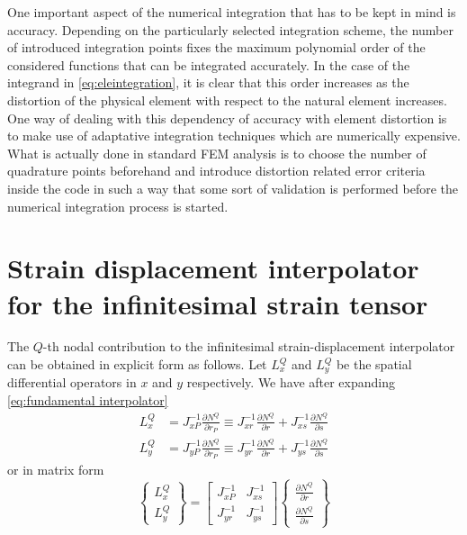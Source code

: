 One important aspect of the numerical integration that has to be kept in mind is accuracy.  Depending on the particularly selected integration scheme, the number of introduced integration points fixes the maximum polynomial order of the considered functions that can be integrated accurately.  In the case of the integrand in \cref{eq:eleintegration}, it is clear that this order increases as the distortion of the physical element  with respect to the natural element increases.  One way of dealing with this dependency of accuracy with element distortion is to make use of adaptative integration techniques which are numerically expensive.  What is actually done in standard FEM analysis is to choose the number of quadrature points beforehand and introduce distortion related error criteria inside the code in such a way that some sort of validation is performed before the numerical integration process is started.

\section*{Strain displacement interpolator for the infinitesimal strain tensor}
The $Q$-th nodal contribution to the infinitesimal strain-displacement interpolator can be obtained in explicit form as follows. Let $L_x^Q$ and $L_y^Q$ be the spatial differential operators in $x$ and $y$ respectively. We have after expanding \cref{eq:fundamental interpolator}
%
\begin{align*}
L_x^Q & = J_{xP}^{-1}\frac{\partial N^Q}{\partial r_P} \equiv J_{xr}^{-1}\frac{\partial N^Q}{\partial r} + J_{xs}^{-1}\frac{\partial N^Q}{\partial s}\\
L_y^Q & = J_{yP}^{-1}\frac{\partial N^Q}{\partial r_P} \equiv J_{yr}^{-1}\frac{\partial N^Q}{\partial r} + J_{ys}^{-1}\frac{\partial N^Q}{\partial s}
\end{align*}
%
or in matrix form
%
\begin{equation}
\begin{Bmatrix}
L_x^Q\\
L_y^Q
\end{Bmatrix} = 
\begin{bmatrix}
J_{xP}^{-1} &J_{xs}^{- 1}\\
J_{yr}^{-1} &J_{ys}^{- 1}
\end{bmatrix}
\begin{Bmatrix}
\frac{\partial N^Q}{\partial r}\\
\frac{\partial N^Q}{\partial s}
\end{Bmatrix}
\end{equation}

